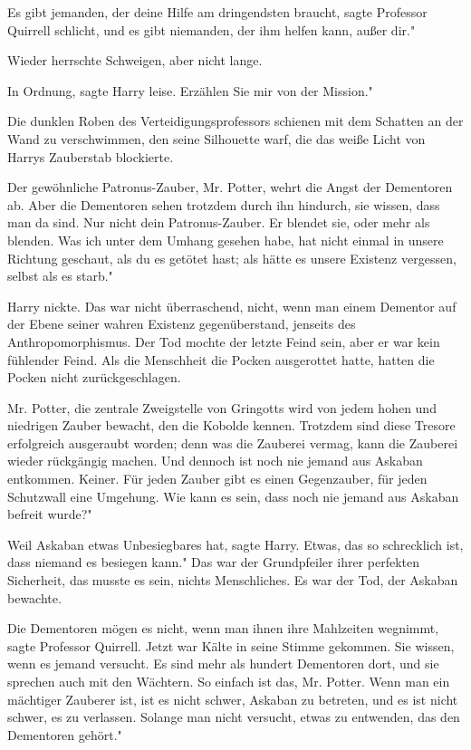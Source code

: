 \glqq Es gibt jemanden, der deine Hilfe am dringendsten braucht\grqq{}, sagte
Professor Quirrell schlicht, \glqq und es gibt niemanden, der ihm helfen kann,
außer dir."

Wieder herrschte Schweigen, aber nicht lange.

\glqq In Ordnung\grqq{}, sagte Harry leise. \glqq Erzählen Sie mir von der
Mission."

Die dunklen Roben des Verteidigungsprofessors schienen mit dem Schatten an der
Wand zu verschwimmen, den seine Silhouette warf, die das weiße Licht von Harrys
Zauberstab blockierte.

\glqq Der gewöhnliche Patronus-Zauber, Mr. Potter, wehrt die Angst der
Dementoren ab. Aber die Dementoren sehen trotzdem durch ihn hindurch, sie
wissen, dass man da sind. Nur nicht dein Patronus-Zauber. Er blendet sie, oder
mehr als blenden. Was ich unter dem Umhang gesehen habe, hat nicht einmal in
unsere Richtung geschaut, als du es getötet hast; als hätte es unsere Existenz
vergessen, selbst als es starb."

Harry nickte. Das war nicht überraschend, nicht, wenn man einem Dementor auf der
Ebene seiner wahren Existenz gegenüberstand, jenseits des Anthropomorphismus.
Der Tod mochte der letzte Feind sein, aber er war kein fühlender Feind. Als die
Menschheit die Pocken ausgerottet hatte, hatten die Pocken nicht
zurückgeschlagen.

\glqq Mr. Potter, die zentrale Zweigstelle von Gringotts wird von jedem hohen
und niedrigen Zauber bewacht, den die Kobolde kennen. Trotzdem sind diese
Tresore erfolgreich ausgeraubt worden; denn was die Zauberei vermag, kann die
Zauberei wieder rückgängig machen. Und dennoch ist noch nie jemand aus Askaban
entkommen. Keiner. Für jeden Zauber gibt es einen Gegenzauber, für jeden
Schutzwall eine Umgehung. Wie kann es sein, dass noch nie jemand aus Askaban
befreit wurde?"

\glqq Weil Askaban etwas Unbesiegbares hat\grqq{}, sagte Harry. \glqq Etwas, das
so schrecklich ist, dass niemand es besiegen kann." Das war der Grundpfeiler
ihrer perfekten Sicherheit, das musste es sein, nichts Menschliches. Es war der
Tod, der Askaban bewachte.

\glqq Die Dementoren mögen es nicht, wenn man ihnen ihre Mahlzeiten
wegnimmt\grqq{}, sagte Professor Quirrell. Jetzt war Kälte in seine Stimme
gekommen. \glqq Sie wissen, wenn es jemand versucht. Es sind mehr als hundert
Dementoren dort, und sie sprechen auch mit den Wächtern. So einfach ist das, Mr.
Potter. Wenn man ein mächtiger Zauberer ist, ist es nicht schwer, Askaban zu
betreten, und es ist nicht schwer, es zu verlassen. Solange man nicht versucht,
etwas zu entwenden, das den Dementoren gehört."

